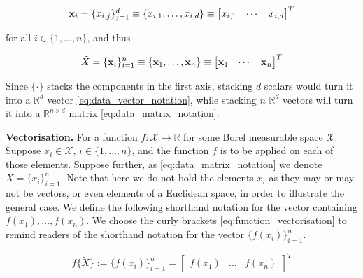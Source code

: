\documentclass[twoside]{article} \usepackage{aistats2017}
\theoremstyle{definition}
\newcommand{\ds}[1]{\tilde{#1}}
\begin{document}
	\begin{equation}
	\mathbf{x}_{i} = \{x_{i, j}\}_{j = 1}^{d} \equiv \{x_{i, 1}, \dots, x_{i, d}\} \equiv \begin{bmatrix}
	x_{i, 1} & \cdots & x_{i, d}
	\end{bmatrix}^{T}
	\label{eq:data_vector_notation}
	\end{equation}
	
	for all $i \in \{1, \dots, n\}$, and thus

	\begin{equation}
		\ds{X} = \{\bvec{x}_{i}\}_{i = 1}^{n} \equiv \{\bvec{x}_{1}, \dots, \bvec{x}_{n}\} \equiv \begin{bmatrix}
			\bvec{x}_{1} & \cdots & \bvec{x}_{n}
		\end{bmatrix}^{T}
	\label{eq:data_matrix_notation}
	\end{equation}
		
	Since $\{ \cdot \}$ stacks the components in the first axis, stacking $d$ scalars would turn it into a $\mathbb{R}^{d}$ vector \eqref{eq:data_vector_notation}, while stacking $n$ $\mathbb{R}^{d}$ vectors will turn it into a $\mathbb{R}^{n \times d}$ matrix \eqref{eq:data_matrix_notation}.
	
	\textbf{Vectorisation.} For a function $f : \mathcal{X} \to \mathbb{R}$ for some Borel measurable space $\mathcal{X}$. Suppose $x_{i} \in \mathcal{X}$, $i \in \{1, \dots, n\}$, and the function $f$ is to be applied on each of those elements. Suppose further, as \eqref{eq:data_matrix_notation} we denote $X = \{x_{i}\}_{i = 1}^{n}$. Note that here we do not bold the elements $x_{i}$ as they may or may not be vectors, or even elements of a Euclidean space, in order to illustrate the general case. We define the following shorthand notation for the vector containing $f(x_{1}), \dots, f(x_{n})$. We choose the curly brackets \eqref{eq:function_vectorisation} to remind readers of the shorthand notation for the vector $\{f(x_{i})\}_{i = 1}^{n}$.
	
	\begin{equation}
		f\{\ds{X}\} := \{f(x_{i})\}_{i = 1}^{n} = {\begin{bmatrix} f(x_{1}) & \dots & f(x_{n}) \end{bmatrix}}^{T}
	\label{eq:function_vectorisation}
	\end{equation}
	
\end{document}
